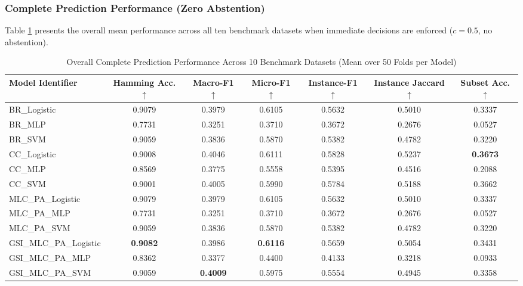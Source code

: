 \documentclass[conference]{IEEEtran}
\begin{document}
\subsubsection{Complete Prediction Performance (Zero Abstention)}
Table \ref{tab:complete_results} presents the overall mean performance across all ten benchmark datasets when immediate decisions are enforced ($c = 0.5$, no abstention).

\begin{table}[htbp]
\caption{Overall Complete Prediction Performance Across 10 Benchmark Datasets (Mean over 50 Folds per Model)}
\label{tab:complete_results}
\centering
\begin{tabular}{lcccccc}
\toprule
\textbf{Model Identifier} & \textbf{Hamming Acc. $\uparrow$} & \textbf{Macro-F1 $\uparrow$} & \textbf{Micro-F1 $\uparrow$} & \textbf{Instance-F1 $\uparrow$} & \textbf{Instance Jaccard $\uparrow$} & \textbf{Subset Acc. $\uparrow$} \\
\midrule
BR\_Logistic & 0.9079 & 0.3979 & 0.6105 & 0.5632 & 0.5010 & 0.3337 \\
BR\_MLP & 0.7731 & 0.3251 & 0.3710 & 0.3672 & 0.2676 & 0.0527 \\
BR\_SVM & 0.9059 & 0.3836 & 0.5870 & 0.5382 & 0.4782 & 0.3220 \\
\midrule
CC\_Logistic & 0.9008 & 0.4046 & 0.6111 & 0.5828 & 0.5237 & \textbf{0.3673} \\
CC\_MLP & 0.8569 & 0.3775 & 0.5558 & 0.5395 & 0.4516 & 0.2088 \\
CC\_SVM & 0.9001 & 0.4005 & 0.5990 & 0.5784 & 0.5188 & 0.3662 \\
\midrule
MLC\_PA\_Logistic & 0.9079 & 0.3979 & 0.6105 & 0.5632 & 0.5010 & 0.3337 \\
MLC\_PA\_MLP & 0.7731 & 0.3251 & 0.3710 & 0.3672 & 0.2676 & 0.0527 \\
MLC\_PA\_SVM & 0.9059 & 0.3836 & 0.5870 & 0.5382 & 0.4782 & 0.3220 \\
\midrule
GSI\_MLC\_PA\_Logistic & \textbf{0.9082} & 0.3986 & \textbf{0.6116} & 0.5659 & 0.5054 & 0.3431 \\
GSI\_MLC\_PA\_MLP & 0.8362 & 0.3377 & 0.4400 & 0.4133 & 0.3218 & 0.0933 \\
GSI\_MLC\_PA\_SVM & 0.9059 & \textbf{0.4009} & 0.5975 & 0.5554 & 0.4945 & 0.3358 \\
\bottomrule
\end{tabular}
\end{table}
\end{document}
